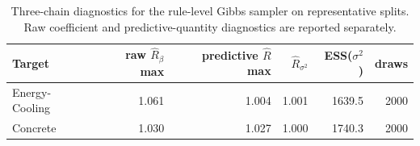 \begin{table}[htbp]
\centering
\caption{Three-chain diagnostics for the rule-level Gibbs sampler on representative splits. Raw coefficient and predictive-quantity diagnostics are reported separately.}
\label{tab:mcmc}
\scriptsize
\begin{tabular}{lrrrrr}
\toprule
Target & raw $\hat R_\beta$ max & predictive $\hat R$ max & $\hat R_{\sigma^2}$ & ESS($\sigma^2$) & draws \\
\midrule
Energy-Cooling & 1.061 & 1.004 & 1.001 & 1639.5 & 2000 \\
Concrete & 1.030 & 1.027 & 1.000 & 1740.3 & 2000 \\
\bottomrule
\end{tabular}
\end{table}
